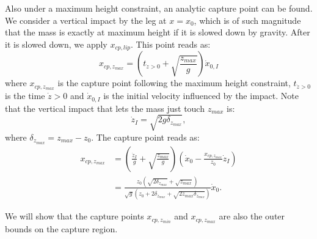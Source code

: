 \documentclass[letterpaper, 10 pt, conference]{ieeeconf}  %
\newcommand{\zmin}{z_{min}}
\newcommand{\zmax}{z_{max}}
\begin{document}
Also under a maximum height constraint, an analytic capture point can be found. We consider a vertical impact by the leg at $x=x_0$, which is of such magnitude that the mass is exactly at maximum height if it is slowed down by gravity. After it is slowed down, we apply $x_{cp,lip}$. This point reads as:
\begin{equation}
	x_{cp,\zmax} =(t_{\dot{z}>0} + \sqrt{\frac{\zmax}{g}})\dot{x}_{0,I}
\end{equation} 
where $x_{cp,\zmax}$ is the capture point following the maximum height constraint, $t_{\dot{z}>0}$ is the time $\dot{z}>0$ and $\dot{x}_{0,I}$ is the initial velocity influenced by the impact. Note that the vertical impact that lets the mass just touch $\zmax$ is:
\begin{equation}
	\dot{z}_{I} = \sqrt{2g\delta_{\zmax}},
\end{equation}
where $\delta_{\zmax}=\zmax-z_0$. The capture point reads as:
\begin{align}
	x_{cp,\zmax} &= (\frac{\dot{z}_I}{g}+\sqrt{\frac{\zmax}{g}})(\dot{x}_0-\frac{x_{cp,\zmax}}{z_0}\dot{z}_I)\\
	&=\frac{z_0(\sqrt{2\delta_{\zmax}}+\sqrt{\zmax})}{\sqrt{g}(z_0 + 2\delta_{\zmax} + \sqrt{2\zmax \delta_{\zmax}})}\dot{x}_0.
\end{align}

We will show that the capture points $x_{cp,\zmin}$ and $x_{cp,\zmax}$ are also the outer bounds on the capture region.
\end{document}
